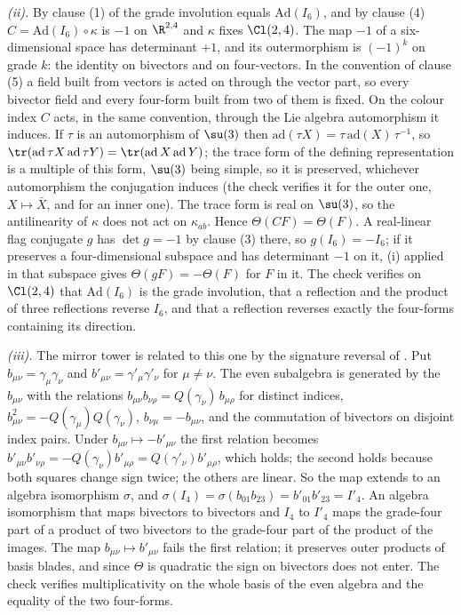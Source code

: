 \emph{(ii).} By clause (1) of  the grade involution equals $\mathrm{Ad}(I_{6})$, and by clause (4) $C = \mathrm{Ad}(I_{6}) \circ \kappa$ is $-1$ on $\R^{2,4}$ and $\kappa$ fixes $\Cl(2,4)$. The map $-1$ of a six-dimensional space has determinant $+1$, and its outermorphism is $(-1)^{k}$ on grade $k$: the identity on bivectors and on four-vectors. In the convention of clause (5) a field built from vectors is acted on through the vector part, so every bivector field and every four-form built from two of them is fixed. On the colour index $C$ acts, in the same convention, through the Lie algebra automorphism it induces. If $\tau$ is an automorphism of $\su(3)$ then $\mathrm{ad}(\tau X) = \tau\,\mathrm{ad}(X)\,\tau^{-1}$, so $\tr(\mathrm{ad}\,\tau X\,\mathrm{ad}\,\tau Y) = \tr(\mathrm{ad}\,X\,\mathrm{ad}\,Y)$; the trace form of the defining representation is a multiple of this form, $\su(3)$ being simple, so it is preserved, whichever automorphism the conjugation induces (the check verifies it for the outer one, $X \mapsto \bar{X}$, and for an inner one). The trace form is real on $\su(3)$, so the antilinearity of $\kappa$ does not act on $\kappa_{ab}$. Hence $\Theta(CF) = \Theta(F)$. A real-linear flag conjugate $g$ has $\det g = -1$ by clause (3) there, so $g(I_{6}) = -I_{6}$; if it preserves a four-dimensional subspace and has determinant $-1$ on it, (i) applied in that subspace gives $\Theta(gF) = -\Theta(F)$ for $F$ in it. The check verifies on $\Cl(2,4)$ that $\mathrm{Ad}(I_{6})$ is the grade involution, that a reflection and the product of three reflections reverse $I_{6}$, and that a reflection reverses exactly the four-forms containing its direction.

\emph{(iii).} The mirror tower is related to this one by the signature reversal of . Put $b_{\mu\nu} = \gamma_{\mu}\gamma_{\nu}$ and $b'_{\mu\nu} = \gamma'_{\mu}\gamma'_{\nu}$ for $\mu \neq \nu$. The even subalgebra is generated by the $b_{\mu\nu}$ with the relations $b_{\mu\nu}b_{\nu\rho} = Q(\gamma_{\nu})\,b_{\mu\rho}$ for distinct indices, $b_{\mu\nu}^{2} = -Q(\gamma_{\mu})Q(\gamma_{\nu})$, $b_{\nu\mu} = -b_{\mu\nu}$, and the commutation of bivectors on disjoint index pairs. Under $b_{\mu\nu} \mapsto -b'_{\mu\nu}$ the first relation becomes $b'_{\mu\nu}b'_{\nu\rho} = -Q(\gamma_{\nu})b'_{\mu\rho} = Q(\gamma'_{\nu})b'_{\mu\rho}$, which holds; the second holds because both squares change sign twice; the others are linear. So the map extends to an algebra isomorphism $\sigma$, and $\sigma(I_{4}) = \sigma(b_{01}b_{23}) = b'_{01}b'_{23} = I'_{4}$. An algebra isomorphism that maps bivectors to bivectors and $I_{4}$ to $I'_{4}$ maps the grade-four part of a product of two bivectors to the grade-four part of the product of the images. The map $b_{\mu\nu} \mapsto b'_{\mu\nu}$ fails the first relation; it preserves outer products of basis blades, and since $\Theta$ is quadratic the sign on bivectors does not enter. The check verifies multiplicativity on the whole basis of the even algebra and the equality of the two four-forms.

